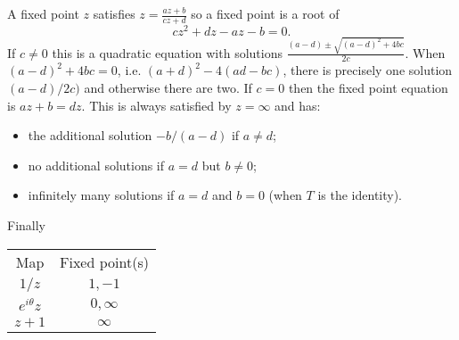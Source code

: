 \documentclass[12pt]{article}
\begin{document}
\begin{answer}
  A fixed point $z$ satisfies $z=\frac{az+b}{cz+d}$ so a fixed point is a root of
  \[cz^2+dz-az-b=0.\]
  If $c\neq 0$ this is a quadratic equation with solutions $\frac{(a-d)\pm\sqrt{(a-d)^2+4bc}}{2c}$. When $(a-d)^2+4bc=0$, i.e. $(a+d)^2-4(ad-bc)$, there is precisely one solution $(a-d)/2c)$ and otherwise there are two. If $c=0$ then the fixed point equation is $az+b=dz$. This is always satisfied by $z=\infty$ and has:
  \begin{itemize}
  \item the additional solution $-b/(a-d)$ if $a\neq d$;
  \item no additional solutions if $a=d$ but $b\neq 0$;
  \item infinitely many solutions if $a=d$ and $b=0$ (when $T$ is the identity).
  \end{itemize}

Finally
  
  \begin{tabular}{cc}
    Map & Fixed point(s)\\
    $1/z$ & $1,-1$\\
    $e^{i\theta}z$ & $0,\infty$\\
    $z+1$ & $\infty$
  \end{tabular}
\end{answer}
\newpage
\end{document}
